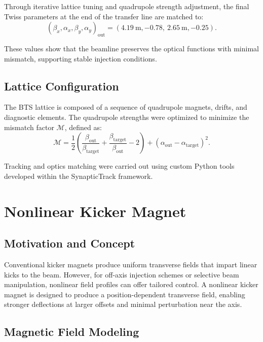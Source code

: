 \documentclass[a4paper,11pt]{article}
\begin{document}
Through iterative lattice tuning and quadrupole strength adjustment, the final Twiss parameters at the end of the transfer line are matched to:
\begin{equation}
    (\beta_x, \alpha_x, \beta_y, \alpha_y)_{\text{out}} = (4.19\ \mathrm{m}, -0.78,\ 2.65\ \mathrm{m}, -0.25).
\end{equation}

These values show that the beamline preserves the optical functions with minimal mismatch, supporting stable injection conditions.

\subsection{Lattice Configuration}

The BTS lattice is composed of a sequence of quadrupole magnets, drifts, and diagnostic elements. The quadrupole strengths were optimized to minimize the mismatch factor $\mathcal{M}$, defined as:
\begin{equation}
    \mathcal{M} = \frac{1}{2} \left( \frac{\beta_{\text{out}}}{\beta_{\text{target}}} + \frac{\beta_{\text{target}}}{\beta_{\text{out}}} - 2 \right) + (\alpha_{\text{out}} - \alpha_{\text{target}})^2.
\end{equation}

Tracking and optics matching were carried out using custom Python tools developed within the SynapticTrack framework.

\section{Nonlinear Kicker Magnet}

\subsection{Motivation and Concept}

Conventional kicker magnets produce uniform transverse fields that impart linear kicks to the beam. However, for off-axis injection schemes or selective beam manipulation, nonlinear field profiles can offer tailored control. A nonlinear kicker magnet is designed to produce a position-dependent transverse field, enabling stronger deflections at larger offsets and minimal perturbation near the axis.

\subsection{Magnetic Field Modeling}
\end{document}
